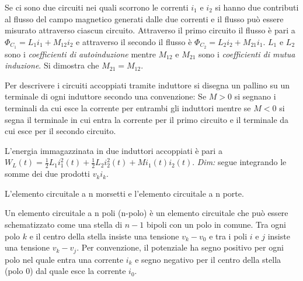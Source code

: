 \documentclass[answers, a4paper,12pt]{exam}
\begin{document}
\begin{questions}
\begin{solution}
		Se ci sono due circuiti nei quali scorrono le correnti $i_1$ e $i_2$ si hanno due contributi al flusso del campo magnetico generati dalle due correnti e il flusso può essere misurato attraverso ciascun circuito. Attraverso il primo circuito il flusso è pari a $\Phi_{C_1} = L_1 i_1 + M_{12} i_2$ e attraverso il secondo il flusso è $\Phi_{C_2} = L_2 i_2 + M_{21} i_1$. $L_1$ e $L_2$ sono i \textit{coefficienti di autoinduzione} mentre $M_{12}$ e $M_{21}$ sono i \textit{coefficienti di mutua induzione}. Si dimostra che $M_{21} = M_{12}$. 
		
		Per descrivere i circuiti accoppiati tramite induttore si disegna un pallino su un terminale di ogni induttore secondo una convenzione: Se $M > 0$ si segnano i terminali da cui esce la corrente per entrambi gli induttori mentre se $M < 0$ si segna il terminale in cui entra la corrente per il primo circuito e il terminale da cui esce per il secondo circuito.
		
		L'energia immagazzinata in due induttori accoppiati è pari a $W_L (t) = \frac{1}{2} L_1 i_1^2(t) + \frac{1}{2} L_2 i_2^2(t) + M i_1(t) i_2(t)$. \textit{Dim:} segue integrando le somme dei due prodotti $v_k i_k$.
	\end{solution}
		\pagebreak
	\question
	L'elemento circuitale a n morsetti e l’elemento circuitale a n porte.
	\begin{solution}
		Un elemento circuitale a n poli (n-polo) è un elemento circuitale che può essere schematizzato come una stella di $n - 1$ bipoli con un polo in comune. Tra ogni polo $k$ e il centro della stella insiste una tensione $v_k - v_0$ e tra i poli $i$ e $j$ insiste una tensione $v_k - v_j$. Per convenzione, il potenziale ha segno positivo per ogni polo nel quale entra una corrente $i_k$  e segno negativo per il centro della stella (polo 0) dal quale esce la corrente $i_0$. 
		

\end{solution}
\end{questions}
\end{document}
